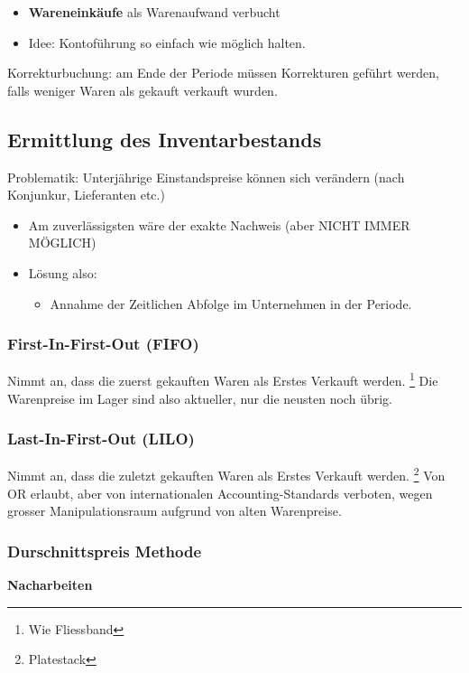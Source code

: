 \begin{itemize}
    \item \textbf{Wareneinkäufe} als Warenaufwand verbucht
    \item Idee: Kontoführung so einfach wie möglich halten.
\end{itemize}

Korrekturbuchung: am Ende der Periode müssen Korrekturen geführt werden, falls weniger Waren als gekauft verkauft wurden.
\pagebreak
\subsection{Ermittlung des Inventarbestands}

Problematik: Unterjährige Einstandspreise können sich verändern (nach Konjunkur, Lieferanten etc.)
\begin{itemize}
    \item Am zuverlässigsten wäre der exakte Nachweis (aber NICHT IMMER MÖGLICH)
    \item Lösung also:
    \begin{itemize}
        \item Annahme der Zeitlichen Abfolge im Unternehmen in der Periode.
    \end{itemize}
\end{itemize}

\subsubsection{First-In-First-Out (FIFO) }
Nimmt an, dass die zuerst gekauften Waren als Erstes Verkauft werden. \footnote{Wie Fliessband} Die Warenpreise im Lager sind also aktueller, nur die neusten noch übrig.
\subsubsection{Last-In-First-Out (LILO)}
Nimmt an, dass die zuletzt gekauften Waren als Erstes Verkauft werden. \footnote{Platestack}
Von OR erlaubt, aber von internationalen Accounting-Standards verboten, wegen grosser Manipulationsraum aufgrund von alten Warenpreise.
\subsubsection{Durschnittspreis Methode}
\textbf{Nacharbeiten}